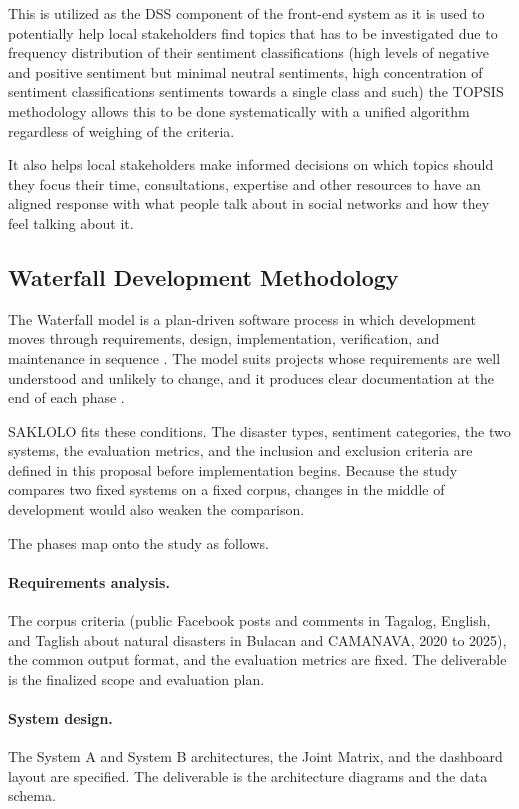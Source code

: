 This is utilized as the DSS component of the front-end system as it is used to potentially help local stakeholders find topics that has to be investigated due to frequency distribution of their sentiment classifications (high levels of negative and positive sentiment but minimal neutral sentiments, high concentration of sentiment classifications sentiments towards a single class and such) the TOPSIS methodology allows this to be done systematically with a unified algorithm regardless of weighing of the criteria.

It also helps local stakeholders make informed decisions on which topics should they focus their time, consultations, expertise and other resources to have an aligned response with what people talk about in social networks and how they feel talking about it.

\subsection*{Waterfall Development Methodology}

The Waterfall model is a plan-driven software process in which development
moves through requirements, design, implementation, verification, and
maintenance in sequence \parencite{sommerville2016}. The model suits projects whose requirements are well
understood and unlikely to change, and it produces clear documentation at the
end of each phase \parencite{pressman2020}.

SAKLOLO fits these conditions. The disaster types, sentiment categories, the two systems, the evaluation metrics, and the inclusion and exclusion criteria
are defined in this proposal before implementation begins. Because the study compares two fixed systems on a fixed corpus, changes in the middle of
development would also weaken the comparison.

The phases map onto the study as follows.

\paragraph{Requirements analysis.} The corpus criteria (public Facebook posts and comments in Tagalog, English, and Taglish about natural disasters in
Bulacan and CAMANAVA, 2020 to 2025), the common output format, and the evaluation metrics are fixed. The deliverable is the finalized scope and
evaluation plan.

\paragraph{System design.} The System A and System B architectures, the Joint Matrix, and the dashboard layout are specified. The deliverable is the
architecture diagrams and the data schema.

